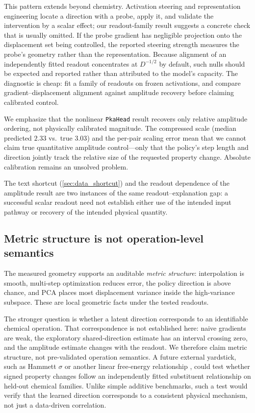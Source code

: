 \documentclass[11pt]{article}
\begin{document}
This pattern extends beyond chemistry. Activation steering and representation engineering locate a direction with a probe, apply it, and validate the intervention by a scalar effect; our readout-family result suggests a concrete check that is usually omitted. If the probe gradient has negligible projection onto the displacement set being controlled, the reported steering strength measures the probe's geometry rather than the representation. Because alignment of an independently fitted readout concentrates at $D^{-1/2}$ by default, such nulls should be expected and reported rather than attributed to the model's capacity. The diagnostic is cheap: fit a family of readouts on frozen activations, and compare gradient--displacement alignment against amplitude recovery before claiming calibrated control.

We emphasize that the nonlinear \texttt{PkaHead} result recovers only relative amplitude ordering, not physically calibrated magnitude. The compressed scale (median predicted $2.33$ vs.\ true $3.03$) and the per-pair scaling error mean that we cannot claim true quantitative amplitude control---only that the policy's step length and direction jointly track the relative size of the requested property change. Absolute calibration remains an unsolved problem.

The text shortcut (\cref{sec:data_shortcut}) and the readout dependence of the amplitude result are two instances of the same readout--explanation gap: a successful scalar readout need not establish either use of the intended input pathway or recovery of the intended physical quantity.

\subsection{Metric structure is not operation-level semantics}

The measured geometry supports an auditable \emph{metric structure}: interpolation is smooth, multi-step optimization reduces error, the policy direction is above chance, and PCA places most displacement variance inside the high-variance subspace. These are local geometric facts under the tested readouts.

The stronger question is whether a latent direction corresponds to an identifiable chemical operation. That correspondence is not established here: naive gradients are weak, the exploratory shared-direction estimate has an interval crossing zero, and the amplitude estimate changes with the readout. We therefore claim metric structure, not pre-validated operation semantics. A future external yardstick, such as Hammett $\sigma$ or another linear free-energy relationship \citep{Hammett1937}, could test whether signed property changes follow an independently fitted substituent relationship on held-out chemical families. Unlike simple additive benchmarks, such a test would verify that the learned direction corresponds to a consistent physical mechanism, not just a data-driven correlation.
\end{document}

